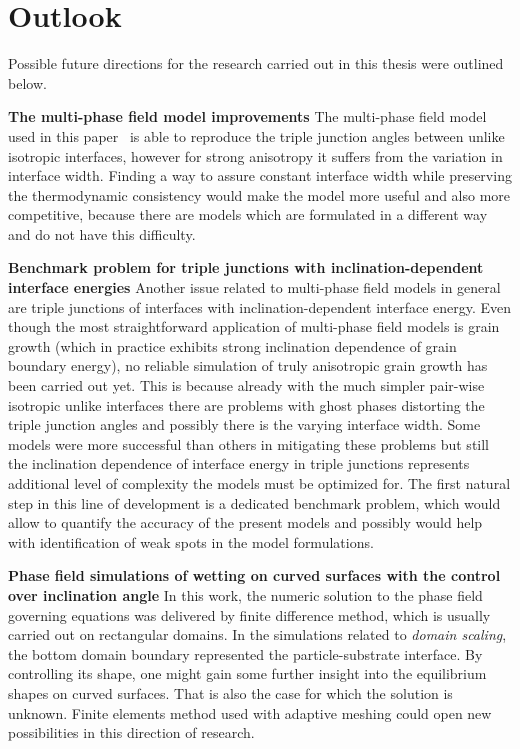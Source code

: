 \section{Outlook}
Possible future directions for the research carried out in this thesis were outlined below.

\textbf{The multi-phase field model improvements} The multi-phase field model used in this paper~\cite{Moelans2008, Minar2022} is able to reproduce the triple junction angles between unlike isotropic interfaces, however for strong anisotropy it suffers from the variation in interface width. Finding a way to assure constant interface width while preserving the thermodynamic consistency would make the model more useful and also more competitive, because there are models which are formulated in a different way and do not have this difficulty.

\textbf{Benchmark problem for triple junctions with inclination-dependent interface energies} Another issue related to multi-phase field models in general are triple junctions of interfaces with inclination-dependent interface energy. Even though the most straightforward application of multi-phase field models is grain growth (which in practice exhibits strong inclination dependence of grain boundary energy), no reliable simulation of truly anisotropic grain growth has been carried out yet. This is because already with the much simpler pair-wise isotropic unlike interfaces there are problems with ghost phases distorting the triple junction angles and possibly there is the varying interface width. Some models were more successful than others in mitigating these problems but still the inclination dependence of interface energy in triple junctions represents additional level of complexity the models must be optimized for. The first natural step in this line of development is a dedicated benchmark problem, which would allow to quantify the accuracy of the present models and possibly would help with identification of weak spots in the model formulations. 

\textbf{Phase field simulations of wetting on curved surfaces with the control over inclination angle} In this work, the numeric solution to the phase field governing equations was delivered by finite difference method, which is usually carried out on rectangular domains. In the simulations related to \textit{domain scaling}, the bottom domain boundary represented the particle-substrate interface. By controlling its shape, one might gain some further insight into the equilibrium shapes on curved surfaces. That is also the case for which the solution is unknown. Finite elements method used with adaptive meshing could open new possibilities in this direction of research.
	
